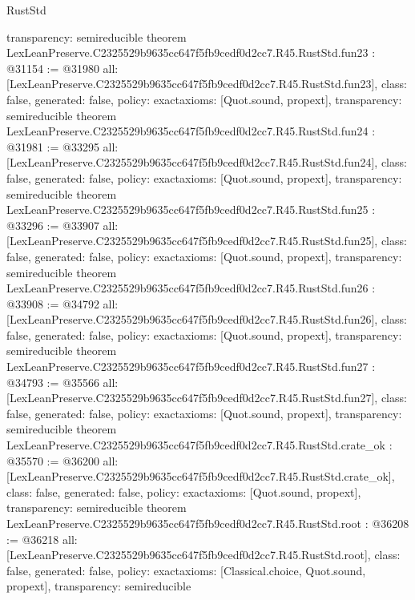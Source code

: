 \begin{lexlean}{RustStd}
\begin{coremodule}
{  transparency: semireducible
}
theorem LexLeanPreserve.C2325529b9635cc647f5fb9cedf0d2cc7.R45.RustStd.fun23 : @31154 := @31980 {
  all: [LexLeanPreserve.C2325529b9635cc647f5fb9cedf0d2cc7.R45.RustStd.fun23],
  class: false,
  generated: false,
  policy: exact{axioms: [Quot.sound, propext]},
  transparency: semireducible
}
theorem LexLeanPreserve.C2325529b9635cc647f5fb9cedf0d2cc7.R45.RustStd.fun24 : @31981 := @33295 {
  all: [LexLeanPreserve.C2325529b9635cc647f5fb9cedf0d2cc7.R45.RustStd.fun24],
  class: false,
  generated: false,
  policy: exact{axioms: [Quot.sound, propext]},
  transparency: semireducible
}
theorem LexLeanPreserve.C2325529b9635cc647f5fb9cedf0d2cc7.R45.RustStd.fun25 : @33296 := @33907 {
  all: [LexLeanPreserve.C2325529b9635cc647f5fb9cedf0d2cc7.R45.RustStd.fun25],
  class: false,
  generated: false,
  policy: exact{axioms: [Quot.sound, propext]},
  transparency: semireducible
}
theorem LexLeanPreserve.C2325529b9635cc647f5fb9cedf0d2cc7.R45.RustStd.fun26 : @33908 := @34792 {
  all: [LexLeanPreserve.C2325529b9635cc647f5fb9cedf0d2cc7.R45.RustStd.fun26],
  class: false,
  generated: false,
  policy: exact{axioms: [Quot.sound, propext]},
  transparency: semireducible
}
theorem LexLeanPreserve.C2325529b9635cc647f5fb9cedf0d2cc7.R45.RustStd.fun27 : @34793 := @35566 {
  all: [LexLeanPreserve.C2325529b9635cc647f5fb9cedf0d2cc7.R45.RustStd.fun27],
  class: false,
  generated: false,
  policy: exact{axioms: [Quot.sound, propext]},
  transparency: semireducible
}
theorem LexLeanPreserve.C2325529b9635cc647f5fb9cedf0d2cc7.R45.RustStd.crate_ok : @35570 := @36200 {
  all: [LexLeanPreserve.C2325529b9635cc647f5fb9cedf0d2cc7.R45.RustStd.crate_ok],
  class: false,
  generated: false,
  policy: exact{axioms: [Quot.sound, propext]},
  transparency: semireducible
}
theorem LexLeanPreserve.C2325529b9635cc647f5fb9cedf0d2cc7.R45.RustStd.root : @36208 := @36218 {
  all: [LexLeanPreserve.C2325529b9635cc647f5fb9cedf0d2cc7.R45.RustStd.root],
  class: false,
  generated: false,
  policy: exact{axioms: [Classical.choice, Quot.sound, propext]},
  transparency: semireducible
}


\end{coremodule}
\end{lexlean}
